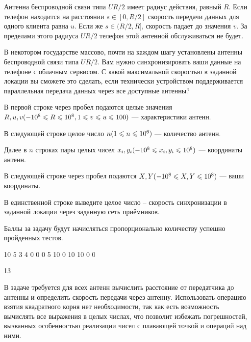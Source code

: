 
Антенна беспроводной связи типа $UR/2$ имеет радиус действия, равный $R$. Если телефон находится на расстоянии $s \in [0, R/2]$  скорость передачи данных для одного клиента равна $u$. Если же $s \in (R/2, R]$, скорость падает до значения $v$. За пределами этого радиуса $UR/2$ телефон этой антенной обслуживаться не будет.

В некотором государстве массово, почти на каждом шагу установлены антенны беспроводной связи типа $UR/2$. Вам нужно синхронизировать ваши данные на телефоне с облачным сервисом. С какой максимальной скоростью в заданной локации вы сможете это сделать, если технически устройством поддерживается параллельная передача данных через все доступные антенны?


В первой строке через пробел подаются целые значения $R, u, v\space(-10^8\leq R\leq 10^8,\space 1\leq v \leq u \leq 100)$ — характеристики антенн.

В следующей строке целое число $n\space (1\leq n\leq 10^6)$  — количество антенн. 

Далее в $n$ строках пары целых чисел $x_i, y_i \space (-10^8\leq x_i, y_i \leq 10^8)$  — координаты антенн.

В следующей строке через пробел подаются $X, Y \space (-10^8\leq X, Y \leq 10^8)$ — ваши координаты.

\outputfmtSection

В единственной строке выведите целое число -- скорость синхронизации в заданной локации через заданную сеть приёмников.

\markSection

Баллы за задачу будут начисляться пропорционально количеству успешно пройденных тестов.


\begin{myverbbox}[\small]{\vinput}
    10 5 3
    4
    0 0
    0 5
    10 0
    10 10
    0 0
\end{myverbbox}

\begin{myverbbox}[\small]{\voutput}
    13
\end{myverbbox}

\solutionSection

В задаче требуется для всех антенн вычислить расстояние от передатчика до антенны и определить скорость передачи через антенну. Использовать операцию взятия квадратного корня нет необходимости, так как есть возможность вычислять все выражения в целых числах, что позволит избежать погрешностей, вызванных особенностью реализации чисел с плавающей точкой и операций над ними. 

